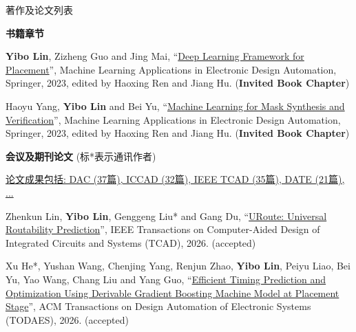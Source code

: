 \begin{rSection}{著作及论文列表}



\textbf{书籍章节}
        

\begin{description}[font=\normalfont, rightmargin=2em]
    

\item[{[B3]}]{
        \textbf{Yibo Lin}, Zizheng Guo and Jing Mai, 
    ``\href{https://doi.org/10.1007/978-3-031-13074-8}{Deep Learning Framework for Placement}'', 
    Machine Learning Applications in Electronic Design Automation, Springer, 2023, edited by Haoxing Ren and Jiang Hu.
    (\textbf{Invited Book Chapter})
}
            

\item[{[B2]}]{
        Haoyu Yang, \textbf{Yibo Lin} and Bei Yu, 
    ``\href{https://doi.org/10.1007/978-3-031-13074-8}{Machine Learning for Mask Synthesis and Verification}'', 
    Machine Learning Applications in Electronic Design Automation, Springer, 2023, edited by Haoxing Ren and Jiang Hu.
    (\textbf{Invited Book Chapter})
}
            

\end{description}
    

\textbf{会议及期刊论文} (标*表示通讯作者)
        

            \underline{论文成果包括: DAC (37篇), ICCAD (32篇), IEEE TCAD (35篇), DATE (21篇), ...} 
    

\begin{description}[font=\normalfont, rightmargin=2em]
    

\item[{[J252]}]{
        Zhenkun Lin, \textbf{Yibo Lin}, Genggeng Liu* and Gang Du, 
    ``\href{https://doi.org/10.1109/TCAD.2025.3636449}{URoute: Universal Routability Prediction}'', 
    IEEE Transactions on Computer-Aided Design of Integrated Circuits and Systems (TCAD), 2026.
    (accepted)
}
            

\item[{[J251]}]{
        Xu He*, Yushan Wang, Chenjing Yang, Renjun Zhao, \textbf{Yibo Lin}, Peiyu Liao, Bei Yu, Yao Wang, Chang Liu and Yang Guo, 
    ``\href{https://doi.org/10.1145/3780100}{Efficient Timing Prediction and Optimization Using Derivable Gradient Boosting Machine Model at Placement Stage}'', 
    ACM Transactions on Design Automation of Electronic Systems (TODAES), 2026.
    (accepted)
}
            


\end{description}
\end{rSection}
